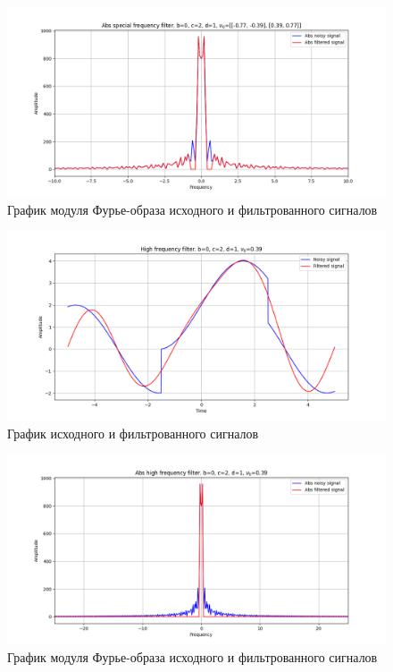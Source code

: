 \documentclass[a4paper, 12pt]{article}
\begin{document}
    \begin{figure}[!htb]
        \centering
        \includegraphics[scale=0.485]{2_abs_u_U_nospec.png}
        \captionsetup{skip=0pt}
        \caption{График модуля Фурье-образа исходного и фильтрованного сигналов}
        \label{fig:fig78}
    \end{figure}
    \begin{figure}[!htb]
        \centering
        \includegraphics[scale=0.485]{2_1_u_flt_u_nospec.png}
        \captionsetup{skip=0pt}
        \caption{График исходного и фильтрованного сигналов}
        \label{fig:fig79}
    \end{figure}
    \begin{figure}[!htb]
        \centering
        \includegraphics[scale=0.485]{2_1_abs_u_U_nospec.png}
        \captionsetup{skip=0pt}
        \caption{График модуля Фурье-образа исходного и фильтрованного сигналов}
        \label{fig:fig80}
    \end{figure}
\end{document}

